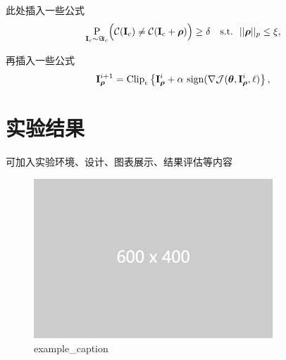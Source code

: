 \documentclass[zihao=-4]{ctexart}
\begin{document}
\begin{spacing}{1.5}
此处插入一些公式
\begin{align}
\underset{{\bf I}_c \sim \boldsymbol\Im_c}{\mathrm{\text P}} \Big( \mathcal C({\bf I}_c) \neq \mathcal C({\bf I}_c + \boldsymbol \rho) \Big) \geq \delta ~~~\text{s.t.}~~||\boldsymbol\rho||_p \leq \xi,
\label{eq:def1}
\end{align}

再插入一些公式
\begin{align}
{\bf I}_{\boldsymbol\rho}^{i + 1} = \text{Clip}_{\epsilon} \left \{ {\bf I}_{\boldsymbol\rho}^i + \alpha~\text{sign} (\nabla \mathcal J(\boldsymbol\theta, {\bf I}_{\boldsymbol\rho}^i, \ell) \right \},
\label{eq:BIM}
\end{align}

\section{实验结果}
可加入实验环境、设计、图表展示、结果评估等内容

\begin{figure}[H] %
    \centering %
    \includegraphics[width=0.8\textwidth]{example-image-2.png} %
    \caption{example\_caption} %
    \label{example_label} %
\end{figure}


\end{spacing}
\end{document}
